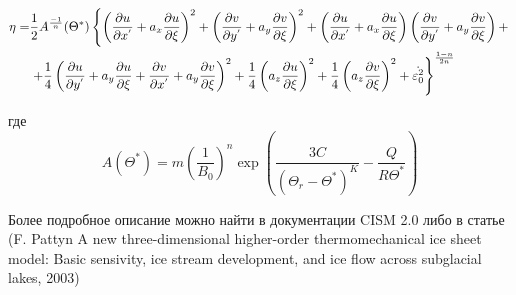 \begin{equation*}
    \begin{split}
        \eta
        =
        &
        \frac{1}{2}
        A^{\frac{-1}{n}}(\Theta^{*})
        \left\{
        \left(
        \frac
        {\partial u}
        {\partial x^{'}}
        +
        a_x
        \frac
        {\partial u}
        {\partial \xi}
        \right)^2
        +
        \left(
        \frac
        {\partial v}
        {\partial y^{'}}
        +
        a_y
        \frac
        {\partial v}
        {\partial \xi}
        \right)^2
        +
        \left(
        \frac
        {\partial u}
        {\partial x^{'}}
        +
        a_x
        \frac
        {\partial u}
        {\partial \xi}
        \right)
        \left(
        \frac
        {\partial v}
        {\partial y^{'}}
        +
        a_y
        \frac
        {\partial v}
        {\partial \xi}
        \right)
        +
        \right.
        \\
        &
        \left.
        +
        \frac
        {1}
        {4}
        \left(
        \frac
        {\partial u}
        {\partial y^{'}}
        +
        a_y
        \frac
        {\partial u}
        {\partial \xi}
        +
        \frac
        {\partial v}
        {\partial x^{'}}
        +
        a_y
        \frac
        {\partial v}
        {\partial \xi}
        \right)^2
        +
        \frac
        {1}
        {4}
        \left(
        a_z
        \frac
        {\partial u}
        {\partial \xi}
        \right)^2
        +
        \frac
        {1}
        {4}
        \left(
        a_z
        \frac
        {\partial v}
        {\partial \xi}
        \right)^2
        +
        \dot{\varepsilon^2_0}
        \right\}^{\frac{1-n}{2n}}
    \end{split}
\end{equation*}

где
\begin{equation*}
    A (\Theta^*)
    =
    m
    \left(
        \frac
            {1}
            {B_0}
    \right)^n
    \exp
    \left(
        \frac
            {3C}
            {(\Theta_r - \Theta^*)^K}
        -
        \frac
            {Q}
            {R\Theta^*}
    \right)
\end{equation*}

Более подробное описание можно найти в документации CISM 2.0 либо
в статье (F. Pattyn A new three-dimensional higher-order 
thermomechanical ice sheet model: Basic sensivity, ice stream
development, and ice flow across subglacial lakes, 2003)

